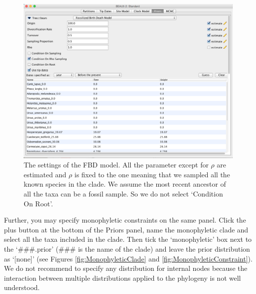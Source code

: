 \documentclass[12pt]{article}
\begin{document}
\begin{figure}	
\centering
\includegraphics[width=\textwidth]{figures/FBDsettings}
\caption{The settings of the FBD model. All the parameter except for $\rho$ are estimated and $\rho$ is fixed to the one meaning that we sampled all the known species in the clade. We assume the most recent ancestor of all the taxa can be a fossil sample. So we do not select `Condition On Root'. \label{fig:FBDsettings}}
\label{fig:BEAUti_ImportNexus}
\end{figure}

Further, you may specify monophyletic constraints on the same panel. Click the plus button at the bottom of the {Priors} panel, name the monophyletic clade and select all the taxa included in the clade. Then tick the `monophyletic' box next to the `\#\#\#.prior' (\#\#\# is the name of the clade) and leave the prior distribution as `[none]' (see Figures \ref{fig:MonophyleticClade} and \ref{fig:MonophyleticConstraint}). We do not recommend to specify any distribution for internal nodes because the interaction between multiple distributions applied to the phylogeny is not well understood.
 
\end{document}
